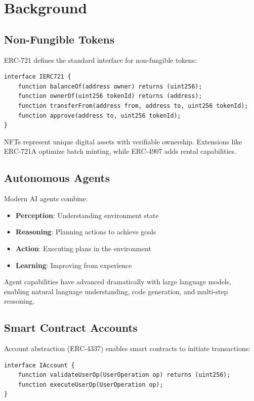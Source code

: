 \documentclass[11pt,letterpaper]{article}
\begin{document}
\section{Background}

\subsection{Non-Fungible Tokens}

ERC-721 defines the standard interface for non-fungible tokens:

\begin{lstlisting}[style=solidity]
interface IERC721 {
    function balanceOf(address owner) returns (uint256);
    function ownerOf(uint256 tokenId) returns (address);
    function transferFrom(address from, address to, uint256 tokenId);
    function approve(address to, uint256 tokenId);
}
\end{lstlisting}

NFTs represent unique digital assets with verifiable ownership. Extensions like ERC-721A optimize batch minting, while ERC-4907 adds rental capabilities.

\subsection{Autonomous Agents}

Modern AI agents combine:
\begin{itemize}
    \item \textbf{Perception}: Understanding environment state
    \item \textbf{Reasoning}: Planning actions to achieve goals
    \item \textbf{Action}: Executing plans in the environment
    \item \textbf{Learning}: Improving from experience
\end{itemize}

Agent capabilities have advanced dramatically with large language models, enabling natural language understanding, code generation, and multi-step reasoning.

\subsection{Smart Contract Accounts}

Account abstraction (ERC-4337) enables smart contracts to initiate transactions:

\begin{lstlisting}[style=solidity]
interface IAccount {
    function validateUserOp(UserOperation op) returns (uint256);
    function executeUserOp(UserOperation op);
}
\end{lstlisting}
\end{document}
